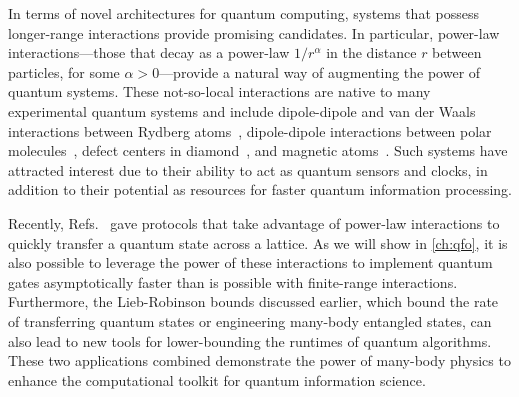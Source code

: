 In terms of novel architectures for quantum computing, systems that possess longer-range interactions provide promising candidates.
In particular, power-law interactions---those that decay as a power-law $1/r^\alpha$ in the distance  $r$ between particles, for some $\alpha > 0$---provide a natural way of augmenting the power of quantum systems.
These not-so-local interactions are native to many experimental quantum systems and include dipole-dipole and van der Waals interactions between Rydberg atoms~\cite{Saffman2010,Weimer2012}, dipole-dipole interactions between polar molecules~\cite{Yan2013}, defect centers in diamond~\cite{Yao2012,Weimer2012}, and magnetic atoms~\cite{Fraxanet2022}.
Such systems have attracted interest due to their ability to act as quantum sensors \cite{Foss-Feig15} and clocks, in addition to their potential as resources for faster quantum information processing.

Recently, Refs.~\cite{kuwaharaStrictlyLinearLight2020,Eldredge2017,Guo2020,Tran2021a} gave protocols that take advantage of power-law interactions to quickly transfer a quantum state across a lattice.
As we will show in \cref{ch:qfo}, it is also possible to leverage the power of these interactions to implement quantum gates asymptotically faster than is possible with finite-range interactions.
Furthermore, the Lieb-Robinson bounds discussed earlier, which bound the rate of transferring quantum states or engineering many-body entangled states, can also lead to new tools for lower-bounding the runtimes of quantum algorithms.
These two applications combined demonstrate the power of many-body physics to enhance the computational toolkit for quantum information science.


